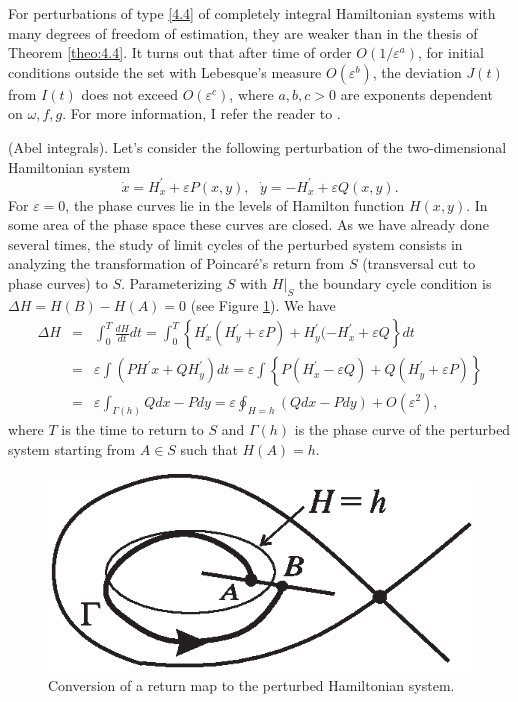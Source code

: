 For perturbations of type \eqref{4.4} of completely integral Hamiltonian systems with many degrees of freedom of estimation, they are weaker than in the thesis of Theorem \ref{theo:4.4}. It turns out that after time of order $O(1/\varepsilon ^{a})$, for initial conditions outside the set with Lebesque's measure $O(\varepsilon ^{b})$, the deviation $J(t)$ from $I(t)$ does not exceed $O(\varepsilon ^{c})$, where $a, b, c> 0$ are exponents dependent on $\omega ,f,g.$ For more information, I refer the reader to \cite{Ar2}.

\begin{example}\label{example:4.5}
	(Abel integrals). Let's consider the following perturbation of the two-dimensional Hamiltonian system
	$$
	\dot{x}=H_{x}^{\prime }+\varepsilon P(x,y),\text{ \ \ \ }\dot{y}%
	=-H_{x}^{\prime }+\varepsilon Q(x,y).
	$$
	For $\varepsilon =0$, the phase curves lie in the levels of Hamilton function $H (x, y)$. In some area of the phase space these curves are closed.
	As we have already done several times, the study of limit cycles of the perturbed system consists in analyzing the transformation of Poincaré's return from $S$ (transversal cut to phase curves) to $S$. Parameterizing $S$ with $H|_{S}$ the boundary cycle condition is $\Delta H=H(B)-H(A)=0$ (see Figure \ref{fig:4.2}). We have
	$$
	\begin{array}{lll}
	\Delta H &=&\int_{0}^{T}\frac{dH}{dt}dt=\int_{0}^{T}\left\{ H_{x}^{\prime
	}\left( H_{y}^{\prime }+\varepsilon P\right) +H_{y}^{\prime }(-H_{x}^{\prime
	}+\varepsilon Q\right\} dt \\
	&=&\varepsilon \int \left( PH^{\prime }x+QH_{y}^{\prime }\right)
	dt=\varepsilon \int \left\{ P(H_{x}^{\prime }-\varepsilon Q)+Q\left(
	H_{y}^{\prime }+\varepsilon P\right) \right\} \\
	&=&\varepsilon \int_{\Gamma (h)}Qdx-Pdy=\varepsilon \oint_{H=h}\left(
	Qdx-Pdy\right) +O(\varepsilon ^{2}),
	\end{array}
	$$
	where $T$ is the time to return to $S$ and $\Gamma (h)$ is the phase curve of the perturbed system starting from $A\in S$ such that $H (A) = h$.
	\begin{figure}[!ht]
		\centering
		\includegraphics [scale=1.4]{jtr42}
		\caption{Conversion of a return map to the perturbed Hamiltonian system.}
		\label{fig:4.2}
	\end{figure}


\end{example}
